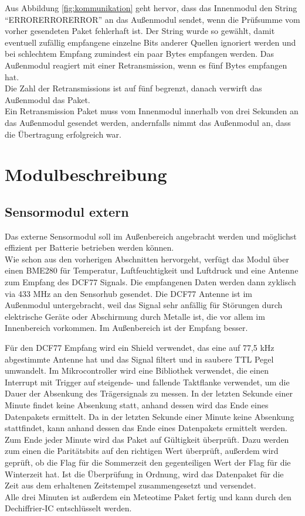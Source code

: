\documentclass[a4paper,11pt]{article}
\begin{document}
\noindent
Aus Abbildung \ref{fig:kommunikation} geht hervor, dass das Innenmodul den String ``ERRORERRORERROR'' an das Außenmodul sendet, wenn die Prüfsumme vom vorher gesendeten Paket
fehlerhaft ist. Der String wurde so gewählt, damit eventuell zufällig empfangene einzelne Bits anderer Quellen ignoriert werden und bei schlechtem Empfang zumindest ein paar Bytes
empfangen werden. Das Außenmodul reagiert mit einer Retransmission, wenn es fünf Bytes empfangen hat. \\
Die Zahl der Retransmissions ist auf fünf begrenzt, danach verwirft das Außenmodul das Paket. \\
Ein Retransmission Paket muss vom Innenmodul innerhalb von drei Sekunden an das Außenmodul gesendet werden, andernfalls nimmt das Außenmodul an, dass die Übertragung
erfolgreich war. 

\section{Modulbeschreibung}
\label{sub:modulbeschreibung}

\subsection{Sensormodul extern}
\label{subsub:sensorModul_ext}

Das externe Sensormodul soll im Außenbereich angebracht werden und möglichst effizient per Batterie betrieben werden können. \\
Wie schon aus den vorherigen Abschnitten hervorgeht, verfügt das Modul über einen BME280 für Temperatur, Luftfeuchtigkeit und Luftdruck
und eine Antenne zum Empfang des DCF77 Signals. Die empfangenen Daten werden dann zyklisch via 433 MHz an den Sensorhub gesendet. Die DCF77 Antenne
ist im Außenmodul untergebracht, weil das Signal sehr anfällig für Störungen durch elektrische Geräte oder Abschirmung durch Metalle ist, 
die vor allem im Innenbereich vorkommen. Im Außenbereich ist der Empfang besser. 

\vspace{0.2cm}
\noindent
Für den DCF77 Empfang wird ein Shield verwendet, das eine auf 77,5 kHz abgestimmte Antenne hat und das Signal filtert und in saubere TTL Pegel umwandelt.
Im Mikrocontroller wird eine Bibliothek verwendet, die einen Interrupt mit Trigger auf steigende- und fallende Taktflanke verwendet, um die Dauer der Absenkung
des Trägersignals zu messen. In der letzten Sekunde einer Minute findet keine Absenkung statt, anhand dessen wird das Ende eines Datenpakets ermittelt.
Da in der letzten Sekunde einer Minute keine Absenkung stattfindet, kann anhand dessen das Ende eines Datenpakets ermittelt werden. 
Zum Ende jeder Minute wird das Paket auf Gültigkeit überprüft. Dazu werden zum einen die Paritätsbits auf den richtigen Wert überprüft, außerdem
wird geprüft, ob die Flag für die Sommerzeit den gegenteiligen Wert der Flag für die Winterzeit hat. 
Ist die Überprüfung in Ordnung, wird das Datenpaket für die Zeit aus dem erhaltenen Zeitstempel zusammengesetzt und versendet. \\
Alle drei Minuten ist außerdem ein Meteotime Paket fertig und kann durch den Dechiffrier-IC entschlüsselt werden. 
\end{document}

